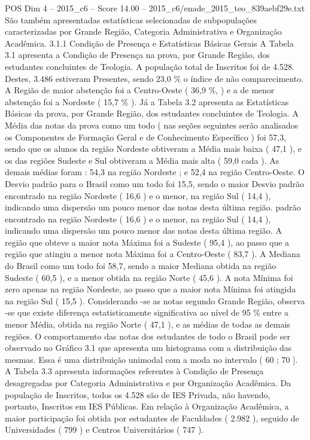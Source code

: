 \begin{textsample}{POS Dim 4 – 2015\_c6 – Score 14.00 – 2015\_c6/enade\_2015\_teo\_839aebf29e.txt}
São também apresentadas estatísticas selecionadas de subpopulações caracterizadas por Grande Região, Categoria Administrativa e Organização Acadêmica. 3.1.1 Condição de Presença e Estatísticas Básicas Gerais A Tabela 3.1 apresenta a Condição de Presença na prova, por Grande Região, dos estudantes concluintes de Teologia.
A população total de Inscritos foi de 4.528.
Destes, 3.486 estiveram Presentes, sendo 23,0 \% o índice de não comparecimento.
A Região de maior abstenção foi a Centro-Oeste ( 36,9 \%, ) e a de menor abstenção foi a Nordeste ( 15,7 \% ).
Já a Tabela 3.2 apresenta as Estatísticas Básicas da prova, por Grande Região, dos estudantes concluintes de Teologia.
A Média das notas da prova como um todo ( nas seções seguintes serão analisados os Componentes de Formação Geral e de Conhecimento Específico ) foi 57,3, sendo que os alunos da região Nordeste obtiveram a Média mais baixa ( 47,1 ), e os das regiões Sudeste e Sul obtiveram a Média mais alta ( 59,0 cada ).
As demais médias foram : 54,3 na região Nordeste ; e 52,4 na região Centro-Oeste.
O Desvio padrão para o Brasil como um todo foi 15,5, sendo o maior Desvio padrão encontrado na região Nordeste ( 16,6 ) e o menor, na região Sul ( 14,4 ), indicando uma dispersão um pouco menor das notas desta última região. padrão encontrado na região Nordeste ( 16,6 ) e o menor, na região Sul ( 14,4 ), indicando uma dispersão um pouco menor das notas desta última região.
A região que obteve a maior nota Máxima foi a Sudeste ( 95,4 ), ao passo que a região que atingiu a menor nota Máxima foi a Centro-Oeste ( 83,7 ).
A Mediana do Brasil como um todo foi 58,7, sendo a maior Mediana obtida na região Sudeste ( 60,5 ), e a menor obtida na região Norte ( 45,6 ).
A nota Mínima foi zero apenas na região Nordeste, ao passo que a maior nota Mínima foi atingida na região Sul ( 15,5 ).
Considerando -se as notas segundo Grande Região, observa -se que existe diferença estatisticamente significativa ao nível de 95 \% entre a menor Média, obtida na região Norte ( 47,1 ), e as médias de todas as demais regiões.
O comportamento das notas dos estudantes de todo o Brasil pode ser observado no Gráfico 3.1 que apresenta um histograma com a distribuição das mesmas.
Essa é uma distribuição unimodal com a moda no intervalo ( 60 ; 70 ].
A Tabela 3.3 apresenta informações referentes à Condição de Presença desagregadas por Categoria Administrativa e por Organização Acadêmica.
Da população de Inscritos, todos os 4.528 são de IES Privada, não havendo, portanto, Inscritos em IES Públicas.
Em relação à Organização Acadêmica, a maior participação foi obtida por estudantes de Faculdades ( 2.982 ), seguido de Universidades ( 799 ) e Centros Universitários ( 747 ).

\end{textsample}
